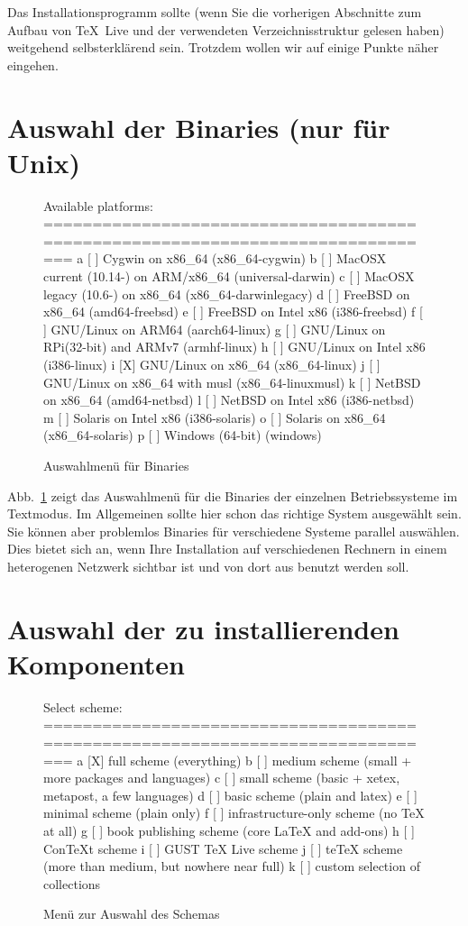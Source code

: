 \documentclass[12pt,ngerman,a4paper,fullparskip]{report}
\newcommand{\TL}{\TeX\ Live\xspace}
\begin{document}
Das Installationsprogramm sollte (wenn Sie die vorherigen Abschnitte zum Aufbau von \TL und der verwendeten Verzeichnisstruktur gelesen haben) weitgehend selbsterklärend sein. Trotzdem wollen wir auf einige Punkte näher eingehen.

\section{Auswahl der Binaries (nur für Unix)}\label{sec:binary}


\begin{figure}[tb]
\begin{boxedverbatim}
Available platforms:
===============================================================================
   a [ ] Cygwin on x86_64 (x86_64-cygwin)
   b [ ] MacOSX current (10.14-) on ARM/x86_64 (universal-darwin)
   c [ ] MacOSX legacy (10.6-) on x86_64 (x86_64-darwinlegacy)
   d [ ] FreeBSD on x86_64 (amd64-freebsd)
   e [ ] FreeBSD on Intel x86 (i386-freebsd)
   f [ ] GNU/Linux on ARM64 (aarch64-linux)
   g [ ] GNU/Linux on RPi(32-bit) and ARMv7 (armhf-linux)
   h [ ] GNU/Linux on Intel x86 (i386-linux)
   i [X] GNU/Linux on x86_64 (x86_64-linux)
   j [ ] GNU/Linux on x86_64 with musl (x86_64-linuxmusl)
   k [ ] NetBSD on x86_64 (amd64-netbsd)
   l [ ] NetBSD on Intel x86 (i386-netbsd)
   m [ ] Solaris on Intel x86 (i386-solaris)
   o [ ] Solaris on x86_64 (x86_64-solaris)
   p [ ] Windows (64-bit) (windows)
\end{boxedverbatim}
\caption{Auswahlmenü für Binaries}\label{fig:bin-text}
\end{figure}

\noindent Abb.~\ref{fig:bin-text} zeigt das Auswahlmenü für die Binaries der einzelnen Betriebssysteme im Textmodus. Im Allgemeinen sollte hier schon das richtige System ausgewählt sein. Sie können aber problemlos Binaries
für verschiedene Systeme parallel auswählen. Dies bietet sich an, wenn Ihre Installation auf verschiedenen Rechnern in einem heterogenen Netzwerk sichtbar ist und von dort aus benutzt werden soll.

\section{Auswahl der zu installierenden Komponenten}\label{sec:components}

\begin{figure}[tbh]
\begin{boxedverbatim}
Select scheme:
===============================================================================
 a [X] full scheme (everything)
 b [ ] medium scheme (small + more packages and languages)
 c [ ] small scheme (basic + xetex, metapost, a few languages)
 d [ ] basic scheme (plain and latex)
 e [ ] minimal scheme (plain only)
 f [ ] infrastructure-only scheme (no TeX at all)
 g [ ] book publishing scheme (core LaTeX and add-ons)
 h [ ] ConTeXt scheme
 i [ ] GUST TeX Live scheme
 j [ ] teTeX scheme (more than medium, but nowhere near full)
 k [ ] custom selection of collections
\end{boxedverbatim}
\caption{Menü zur Auswahl des Schemas}\label{fig:scheme-text}
\end{figure}
\end{document}

